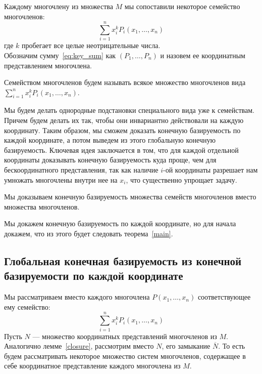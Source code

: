 Каждому многочлену из множества $M$ мы сопоставили некоторое семейство многочленов:
\begin{equation}
    \label{eq:key_sum}
    \sum\limits_{i=1}^n x_i^k P_i(x_1,\ldots,x_n)
\end{equation}
где $k$ пробегает все целые неотрицательные числа.\\
Обозначим сумму~\eqref{eq:key_sum} как $(P_1,\ldots,P_n)$ и назовем ее координатным представлением многочлена.\\
\vskip 0.1in\noindent
\begin{definition}
    Семейством многочленов будем называть всякое множество многочленов вида $\sum\limits_{i=1}^n x_i^k P_i(x_1,\ldots,x_n)$.
\end{definition}
\vskip 0.1in\noindent

Мы будем делать однородные подстановки специального вида уже к семействам.
Причем будем делать их так, чтобы они инвариантно действовали на каждую координату.
Таким образом, мы сможем доказать конечную базируемость по каждой координате, а потом выведем из этого глобальную конечную базируемость.
Ключевая идея заключается в том, что для каждой отдельной координаты доказывать конечную базируемость куда проще, чем для бескоординатного представления, так как наличие $i$-ой координаты разрешает нам умножать многочлены внутри нее на $x_i$, что существенно упрощает задачу.
\vskip 0.1in\noindent
\begin{remark}
    Мы доказываем конечную базируемость множества семейств многочленов вместо множества многочленов.
\end{remark}
\vskip 0.1in\noindent

Мы докажем конечную базируемость по каждой координате, но для начала докажем, что из этого будет следовать теорема~\ref{main}.

\subsection{Глобальная конечная базируемость из конечной базируемости по каждой координате}\label{subsec:grishin-global-from-local}
Мы рассматриваем вместо каждого многочлена $P(x_1,\ldots,x_n)$ соответствующее ему семейство:
\[\sum\limits_{i=1}^n x_i^k P_i(x_1,\ldots,x_n)\] Пусть $N$ --- множество координатных представлений многочленов из $M$.
Аналогично лемме~\ref{closure}, рассмотрим вместо $N$, его замыкание $\overline{N}$.
То есть будем рассматривать некоторое множество систем многочленов, содержащее в себе координатное представление каждого многочлена из $M$.

